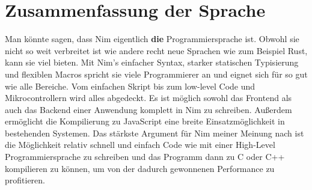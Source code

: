 \documentclass[11pt]{report}
\begin{document}
\section{Zusammenfassung der Sprache}
Man könnte sagen, dass Nim eigentlich \textbf{die} Programmiersprache ist. Obwohl sie nicht so weit verbreitet ist wie andere recht neue Sprachen wie zum Beispiel Rust, kann sie viel bieten. Mit Nim's einfacher Syntax, starker statischen Typisierung und flexiblen Macros spricht sie viele Programmierer an und eignet sich für so gut wie alle Bereiche. Vom einfachen Skript bis zum low-level Code und Mikrocontrollern wird alles abgedeckt. Es ist möglich sowohl das Frontend als auch das Backend einer Anwendung komplett in Nim zu schreiben. Außerdem ermöglicht die Kompilierung zu JavaScript eine breite Einsatzmöglichkeit in bestehenden Systemen. Das stärkste Argument für Nim meiner Meinung nach ist die Möglichkeit relativ schnell und einfach Code wie mit einer High-Level Programmiersprache zu schreiben und das Programm dann zu C oder C++ kompilieren zu können, um von der dadurch gewonnenen Performance zu profitieren.
\end{document}
